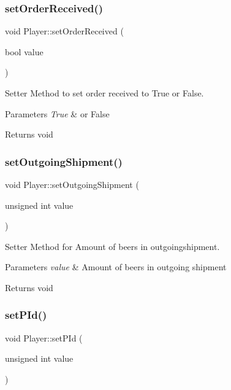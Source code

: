 \subsubsection{\texorpdfstring{set\+Order\+Received()}{setOrderReceived()}}
{\footnotesize\ttfamily void Player\+::set\+Order\+Received (\begin{DoxyParamCaption}\item[{bool}]{value }\end{DoxyParamCaption})}



Setter Method to set order received to True or False. 


\begin{DoxyParams}{Parameters}
{\em True} & or False \\
\hline
\end{DoxyParams}
\begin{DoxyReturn}{Returns}
void 
\end{DoxyReturn}
\mbox{\label{classPlayer_aeed18c6e38773f2c8035b8604b38df29}} 
\subsubsection{\texorpdfstring{set\+Outgoing\+Shipment()}{setOutgoingShipment()}}
{\footnotesize\ttfamily void Player\+::set\+Outgoing\+Shipment (\begin{DoxyParamCaption}\item[{unsigned int}]{value }\end{DoxyParamCaption})}



Setter Method for Amount of beers in outgoingshipment. 


\begin{DoxyParams}{Parameters}
{\em value} & Amount of beers in outgoing shipment \\
\hline
\end{DoxyParams}
\begin{DoxyReturn}{Returns}
void 
\end{DoxyReturn}
\mbox{\label{classPlayer_a016beea94a91d74bc04d29088228316b}} 
\subsubsection{\texorpdfstring{set\+P\+Id()}{setPId()}}
{\footnotesize\ttfamily void Player\+::set\+P\+Id (\begin{DoxyParamCaption}\item[{unsigned int}]{value }\end{DoxyParamCaption})}



